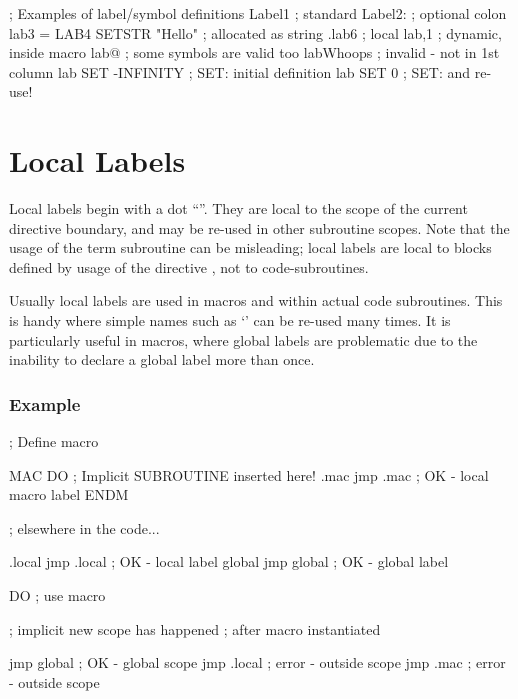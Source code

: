 \begin{code}[caption=Global Label Definitions]
; Examples of label/symbol definitions
Label1               ; standard
Label2:              ; optional colon
lab3 = %
LAB4 SETSTR "Hello"  ; allocated as string
.lab6                ; local
lab,{1}              ; dynamic, inside macro
lab@                 ; some symbols are valid too
 labWhoops           ; invalid - not in 1st column
lab SET -INFINITY    ; SET: initial definition
lab SET 0            ; SET: and re-use!
\end{code}


\section{Local Labels}
\label{locallabels}

Local labels begin with a dot ``''. They are local to the scope of the current  directive boundary, and may be re-used in other subroutine scopes. Note that the usage of the term subroutine can be misleading; local labels are local to blocks defined by usage of the directive , not to code-subroutines.

Usually local labels are used in macros and within actual code subroutines. This is handy where simple names such as `' can be re-used many times. It is particularly useful in macros, where global labels are problematic due to the inability to declare a global label more than once.

\subsubsection{Example}
\begin{code}[caption=Scope of Local Labels]
    ; Define macro

    MAC DO
        ; Implicit SUBROUTINE inserted here!
.mac    jmp .mac       ; OK - local macro label       
    ENDM
    
    ; elsewhere in the code...
    
.local  jmp .local     ; OK - local label
global  jmp global     ; OK - global label

        DO             ; use macro

    ; implicit new scope has happened
    ; after macro instantiated

        jmp global     ; OK - global scope
        jmp .local     ; error - outside scope
        jmp .mac       ; error - outside scope

\end{code}

